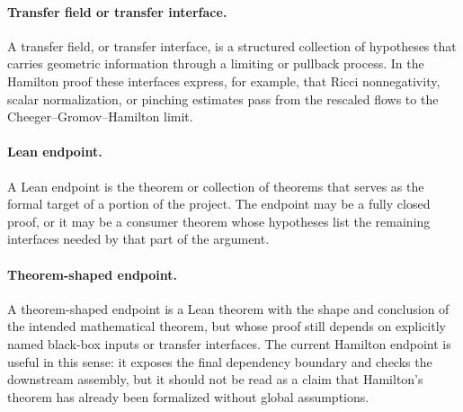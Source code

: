 \documentclass[11pt]{article}
\theoremstyle{plain}
\theoremstyle{definition}
\theoremstyle{remark}
\begin{document}
\paragraph{Transfer field or transfer interface.}
A transfer field, or transfer interface, is a structured collection of
hypotheses that carries geometric information through a limiting or pullback
process.  In the Hamilton proof these interfaces express, for example, that
Ricci nonnegativity, scalar normalization, or pinching estimates pass from the
rescaled flows to the Cheeger--Gromov--Hamilton limit.

\paragraph{Lean endpoint.}
A Lean endpoint is the theorem or collection of theorems that serves as the
formal target of a portion of the project.  The endpoint may be a fully closed
proof, or it may be a consumer theorem whose hypotheses list the remaining
interfaces needed by that part of the argument.

\paragraph{Theorem-shaped endpoint.}
A theorem-shaped endpoint is a Lean theorem with the shape and conclusion of
the intended mathematical theorem, but whose proof still depends on explicitly
named black-box inputs or transfer interfaces.  The current Hamilton endpoint is
useful in this sense: it exposes the final dependency boundary and checks the
downstream assembly, but it should not be read as a claim that Hamilton's theorem
has already been formalized without global assumptions.
\end{document}
